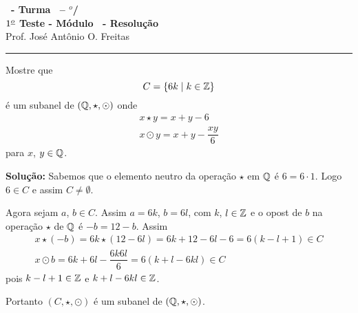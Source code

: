 \documentclass[12pt]{exam}
\begin{document}
\begin{center}
{\Large\bf \disciplina\ - Turma \turma\ -- \semestre$^{o}$/\ano} \\ \vspace{9pt} {\large\bf
$1^{\underline{o}}$ Teste - M\'odulo \modulo\ - Resolu\c{c}\~ao}\\
\vspace{9pt} Prof. Jos{\'e} Ant{\^o}nio O. Freitas
\end{center}
\hrule

\vspace{.6cm}

\questao{} Mostre que
\[
	C = \{6k \mid k \in \mathbb{Z}\}
\]
é um subanel de $(\mathbb{Q}, \star, \odot)$ onde
\begin{align*}
	x \star y = x + y - 6\\
	x \odot y = x + y - \dfrac{xy}{6}
\end{align*}
para $x$, $y \in \mathbb{Q}$.

\noindent\textbf{Solu\c{c}\~ao:} Sabemos que o elemento neutro da operação $\star$ em $\mathbb{Q}$ é $6 = 6\cdot 1$. Logo $6 \in C$ e assim $C \neq \emptyset$.

Agora sejam $a$, $b \in C$. Assim $a = 6k$, $b = 6l$, com $k$, $l \in \mathbb{Z}$ e o opost de $b$ na operação $\star$ de $\mathbb{Q}$ é $-b = 12 - b$. Assim
\begin{align*}
	x \star (-b) = 6k \star (12 - 6l) = 6k + 12 - 6l - 6 = 6(k - l + 1) \in C\\
	x \odot b = 6k + 6l - \dfrac{6k6l}{6} = 6(k + l - 6kl) \in C
\end{align*}
pois $k - l + 1 \in \mathbb{Z}$ e $k + l - 6kl \in \mathbb{Z}$.

Portanto $(C, \star, \odot)$ é um subanel de $(\mathbb{Q}, \star, \odot)$.
\end{document}
